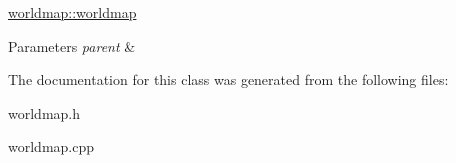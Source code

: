 \hyperlink{classworldmap_a970f51f58c07cc43b110fecf43519838}{worldmap\-::worldmap} 


\begin{DoxyParams}{Parameters}
{\em parent} & \\
\hline
\end{DoxyParams}


The documentation for this class was generated from the following files\-:\begin{DoxyCompactItemize}
\item 
worldmap.\-h\item 
worldmap.\-cpp\end{DoxyCompactItemize}
